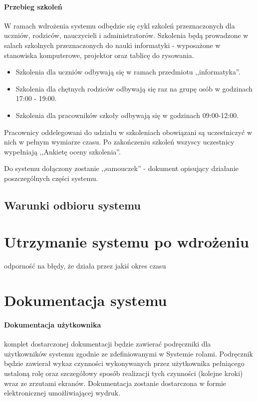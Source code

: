 \documentclass{article}
\begin{document}
\paragraph{Przebieg szkoleń}
W ramach wdrożenia systemu odbędzie się cykl szkoleń przeznaczonych dla uczniów, rodziców, nauczycieli i administratorów. Szkolenia będą prowadzone w salach szkolnych przeznaczonych do nauki informatyki - wyposażone w stanowiska komputerowe, projektor oraz tablicę do rysowania.
\begin{itemize}
\item Szkolenia dla uczniów odbywają się w ramach przedmiotu ,,informatyka''.
\item Szkolenia dla chętnych rodziców odbywają się raz na grupę osób w godzinach 17:00 - 19:00.
\item Szkolenia dla pracowników szkoły odbywają się w godzinach 09:00-12:00.
\end{itemize}
Pracownicy oddelegowani do udziału w szkoleniach obowiązani są uczestniczyć w nich w pełnym wymiarze czasu. Po zakończeniu szkoleń wszyscy uczestnicy wypełniają ,,Ankietę oceny szkolenia''.

Do systemu dołączony zostanie ,,samouczek'' - dokument opisujący działanie poszczególnych części systemu.

\subsection{Warunki odbioru systemu}

\section{Utrzymanie systemu po wdrożeniu}
odporność na błędy, że działa przez jakiś okres czasu

\section{Dokumentacja systemu}
\paragraph{Dokumentacja użytkownika} komplet dostarczonej dokumentacji będzie zawierać podręczniki dla użytkowników systemu zgodnie ze zdefiniowanymi w Systemie rolami. Podręcznik będzie zawierał wykaz czynności wykonywanych przez użytkownika pełniącego ustaloną rolę oraz szczegółowy sposób realizacji tych czynności (kolejne kroki) wraz ze zrzutami ekranów. Dokumentacja zostanie dostarczona w formie elektronicznej umożliwiającej wydruk.
\end{document}
